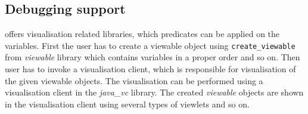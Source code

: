 \subsection{Debugging support}
\eclipse offers visualisation related libraries, which predicates can be applied 
on the variables. First the user has to create a viewable object using \texttt{create\_viewable}
from {\em viewable} library which contains variables in a proper order and so on. Then
user has to invoke a visualisation client, which is responsible for visualisation of the 
given viewable objects. The visualisation can be performed using a visualisation client
in the {\em java\_vc} library. The created {\em viewable} objects are shown in
the visualisation client using several types of viewlets and so on. 
